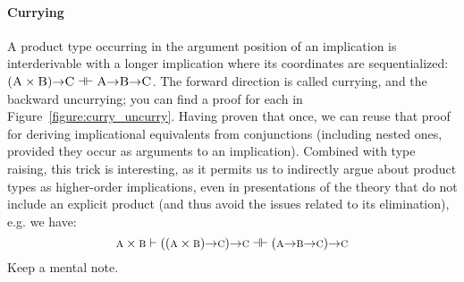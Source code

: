 \paragraph{Currying}
A product type occurring in the argument position of an implication is interderivable with a longer implication where its coordinates are sequentialized: $(\smallprop{A}\times\smallprop{B}) \ii \smallprop{C} \dashv \vdash \smallprop{A} \ii \smallprop{B} \ii \smallprop{C}$.
The forward direction is called currying, and the backward uncurrying; you can find a proof for each in Figure~\ref{figure:curry_uncurry}.
Having proven that once, we can reuse that proof for deriving implicational equivalents from conjunctions (including nested ones, provided they occur as arguments to an implication).
Combined with type raising, this trick is interesting, as it permits us to indirectly argue about product types as higher-order implications, even in presentations of the theory that do not include an explicit product (and thus avoid the issues related to its elimination), e.g. we have:
\begin{equation}
	\prop{a} \times \prop{b} \vdash ((\prop{a} \times \prop{b}) \ii \prop{c}) \ii \prop{c} \dashv \vdash (\prop{a} \ii \prop{b} \ii \prop{c}) \ii \prop{c}
\end{equation}
Keep a mental note.

